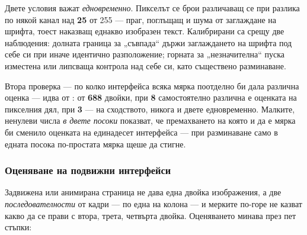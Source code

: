 Двете условия важат \emph{едновременно}. Пикселът се брои различаващ се при разлика по
някой канал над \textbf{25} от 255 --- праг, поглъщащ и шума от заглаждане на шрифта,
тоест наказващ еднакво изобразен текст. Калибрирани са срещу две наблюдения: долната
граница за „съвпада“ държи заглаждането на шрифта под себе си при иначе идентично
разположение; горната за „незначителна“ пуска изместена или липсваща контрола над себе
си, като съществено разминаване.

Втора проверка --- по колко интерфейса всяка мярка поотделно би дала различна оценка
--- идва от : от \textbf{688} двойки, при \textbf{8} самостоятелно
различна е оценката на пикселния дял, при \textbf{3} --- на сходството, никога и
двете едновременно. Малките, ненулеви числа \emph{в двете посоки} показват, че
премахването на която и да
е мярка би сменило оценката на единадесет интерфейса --- при разминаване само в
едната посока по-простата мярка щеше да стигне.

\subsubsection{Оценяване на подвижни интерфейси}
\label{subsec:motion_scoring}

Задвижена или анимирана страница не дава една двойка изображения, а две
\emph{последователности} от кадри --- по една на колона --- и мерките по-горе не казват
какво да се прави с втора, трета, четвърта двойка. Оценяването минава през пет стъпки:

